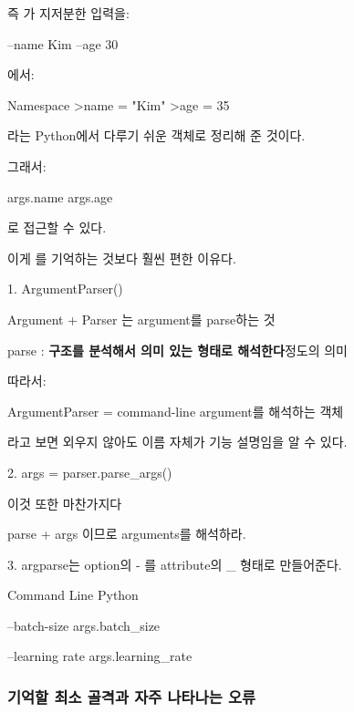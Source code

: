 즉 가 지저분한 입력을:

\begin{dhkzsh}
--name Kim --age 30
\end{dhkzsh}

에서:

\begin{dhkdir}
Namespace
>name = "Kim"
>age = 35
\end{dhkdir}

라는 Python에서 다루기 쉬운 객체로 정리해 준 것이다.

그래서:

\begin{dhkcode}
args.name
args.age
\end{dhkcode}

로 접근할 수 있다.

이게 를 기억하는 것보다 훨씬 편한 이유다.

\begin{dhknote}
\begin{dhksmry}
1. ArgumentParser()

    Argument + Parser 는 argument를 parse하는 것

    parse : \textbf{구조를 분석해서 의미 있는 형태로 해석한다}정도의 의미

    따라서:

    ArgumentParser = command-line argument를 해석하는 객체

    라고 보면 외우지 않아도 이름 자체가 기능 설명임을 알 수 있다.


2. args = parser.parse_args()      

    이것 또한 마찬가지다

    parse + args 이므로 arguments를 해석하라.


3. argparse는 option의 - 를 attribute의 _ 형태로 만들어준다.

    Command Line            Python

    --batch-size      \ra     args.batch_size   
    
    --learning rate   \ra     args.learning_rate

\end{dhksmry}
\end{dhknote}

\subsubsection{기억할 최소 골격과 자주 나타나는 오류}

